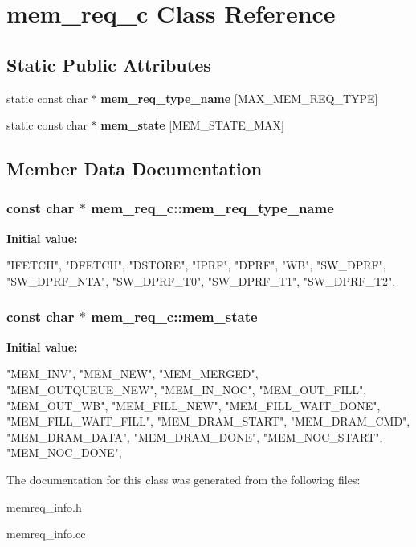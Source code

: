 \hypertarget{classmem__req__c}{
\section{mem\_\-req\_\-c Class Reference}
\label{classmem__req__c}
}
\subsection*{Static Public Attributes}
\begin{DoxyCompactItemize}
\item 
static const char $\ast$ {\bfseries mem\_\-req\_\-type\_\-name} \mbox{[}MAX\_\-MEM\_\-REQ\_\-TYPE\mbox{]}
\item 
static const char $\ast$ {\bfseries mem\_\-state} \mbox{[}MEM\_\-STATE\_\-MAX\mbox{]}
\end{DoxyCompactItemize}


\subsection{Member Data Documentation}
\hypertarget{classmem__req__c_a3f50969bb3742eb9b01e5390c99589ab}{
\subsubsection[{mem\_\-req\_\-type\_\-name}]{\setlength{\rightskip}{0pt plus 5cm}const char $\ast$ mem\_\-req\_\-c::mem\_\-req\_\-type\_\-name}}
\label{classmem__req__c_a3f50969bb3742eb9b01e5390c99589ab}
{\bfseries Initial value:}
\begin{DoxyCode}
 {
  "IFETCH",
  "DFETCH",
  "DSTORE",
  "IPRF",
  "DPRF",
  "WB",
  "SW_DPRF",
  "SW_DPRF_NTA",
  "SW_DPRF_T0",
  "SW_DPRF_T1",
  "SW_DPRF_T2",
}
\end{DoxyCode}
\hypertarget{classmem__req__c_aa1a55583f778ef7c4f29047a8ff8553b}{
\subsubsection[{mem\_\-state}]{\setlength{\rightskip}{0pt plus 5cm}const char $\ast$ mem\_\-req\_\-c::mem\_\-state}}
\label{classmem__req__c_aa1a55583f778ef7c4f29047a8ff8553b}
{\bfseries Initial value:}
\begin{DoxyCode}
 {
  "MEM_INV",
  "MEM_NEW",
  "MEM_MERGED",
  "MEM_OUTQUEUE_NEW",
  "MEM_IN_NOC",
  "MEM_OUT_FILL",
  "MEM_OUT_WB",
  "MEM_FILL_NEW",
  "MEM_FILL_WAIT_DONE",
  "MEM_FILL_WAIT_FILL",
  "MEM_DRAM_START",
  "MEM_DRAM_CMD",
  "MEM_DRAM_DATA",
  "MEM_DRAM_DONE",
  "MEM_NOC_START",
  "MEM_NOC_DONE",
}
\end{DoxyCode}


The documentation for this class was generated from the following files:\begin{DoxyCompactItemize}
\item 
memreq\_\-info.h\item 
memreq\_\-info.cc\end{DoxyCompactItemize}
